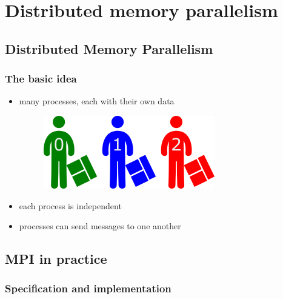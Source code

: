 \section{Distributed memory
parallelism}\label{distributed-memory-parallelism}

\subsection{Distributed Memory
Parallelism}\label{distributed-memory-parallelism-1}

\subsubsection{The basic idea}\label{the-basic-idea}

\begin{itemize}
\item
  many processes, each with their own data

  \begin{figure}[htbp]
  \centering
  \includegraphics{06MPI/figures/many.png}
  \end{figure}
\item
  each process is independent
\item
  processes can send messages to one another
\end{itemize}

\subsection{MPI in practice}\label{mpi-in-practice}

\subsubsection{Specification and
implementation}\label{specification-and-implementation}

